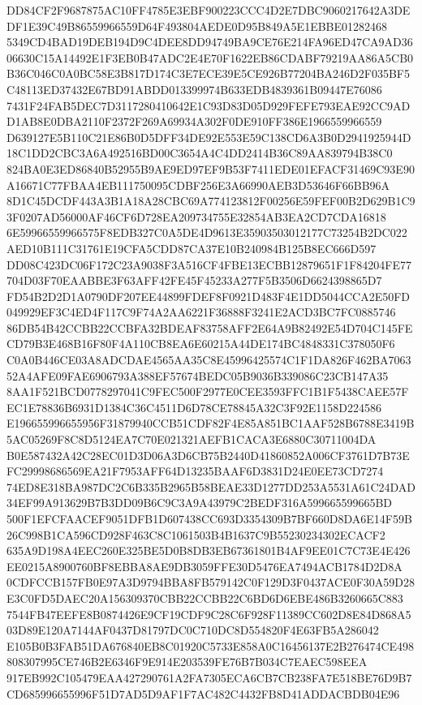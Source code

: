 \documentclass[UTF8,fontset=fandol,zihao=-4,a4paper]{ctexart}
\begin{document}
{{DD84CF2F9687875AC10FF4785E3EBF900223CCC4D2E7DBC9060217642A3DEDF1E39C49B86559966559D64F493804AEDE0D95B849A5E1EBBE01282468
5349CD4BAD19DEB194D9C4DEE8DD94749BA9CE76E214FA96ED47CA9AD3606630C15A14492E1F3EB0B47ADC2E4E70F1622EB86CDABF79219AA86A5CB0
B36C046C0A0BC58E3B817D174C3E7ECE39E5CE926B77204BA246D2F035BF5C48113ED37432E67BD91ABDD013399974B633EDB4839361B09447E76086
7431F24FAB5DEC7D3117280410642E1C93D83D05D929FEFE793EAE92CC9ADD1AB8E0DBA2110F2372F269A69934A302F0DE910FF386E1966559966559
D639127E5B110C21E86B0D5DFF34DE92E553E59C138CD6A3B0D2941925944D18C1DD2CBC3A6A492516BD00C3654A4C4DD2414B36C89AA839794B38C0
824BA0E3ED86840B52955B9AE9ED97EF9B53F7411EDE01EFACF31469C93E90A16671C77FBAA4EB111750095CDBF256E3A66990AEB3D53646F66BB96A
8D1C45DCDF443A3B1A18A28CBC69A774123812F00256E59FEF00B2D629B1C93F0207AD56000AF46CF6D728EA209734755E32854AB3EA2CD7CDA16818
6E59966559966575F8EDB327C0A5DE4D9613E35903503012177C73254B2DC022AED10B111C31761E19CFA5CDD87CA37E10B240984B125B8EC666D597
DD08C423DC06F172C23A9038F3A516CF4FBE13ECBB12879651F1F84204FE77704D03F70EAABBE3F63AFF42FE45F45233A277F5B3506D6624398865D7
FD54B2D2D1A0790DF207EE44899FDEF8F0921D483F4E1DD5044CCA2E50FD049929EF3C4ED4F117C9F74A2AA6221F36888F3241E2ACD3BC7FC0885746
86DB54B42CCBB22CCBFA32BDEAF83758AFF2E64A9B82492E54D704C145FECD79B3E468B16F80F4A110CB8EA6E60215A44DE174BC4848331C378050F6
C0A0B446CE03A8ADCDAE4565AA35C8E45996425574C1F1DA826F462BA706352A4AFE09FAE6906793A388EF57674BEDC05B9036B339086C23CB147A35
8AA1F521BCD0778297041C9FEC500F2977E0CEE3593FFC1B1F5438CAEE57FEC1E78836B6931D1384C36C4511D6D78CE78845A32C3F92E1158D224586
E196655996655956F31879940CCB51CDF82F4E85A851BC1AAF528B6788E3419B5AC05269F8C8D5124EA7C70E021321AEFB1CACA3E6880C30711004DA
B0E587432A42C28EC01D3D06A3D6CB75B2440D41860852A006CF3761D7B73EFC29998686569EA21F7953AFF64D13235BAAF6D3831D24E0EE73CD7274
74ED8E318BA987DC2C6B335B2965B58BEAE33D1277DD253A5531A61C24DAD34EF99A913629B7B3DD09B6C9C3A9A43979C2BEDF316A599665599665BD
500F1EFCFAACEF9051DFB1D607438CC693D3354309B7BF660D8DA6E14F59B26C998B1CA596CD928F463C8C1061503B4B1637C9B55230234302ECACF2
635A9D198A4EEC260E325BE5D0B8DB3EB67361801B4AF9EE01C7C73E4E426EE0215A8900760BF8EBBA8AE9DB3059FFE30D5476EA7494ACB1784D2D8A
0CDFCCB157FB0E97A3D9794BBA8FB579142C0F129D3F0437ACE0F30A59D28E3C0FD5DAEC20A156309370CBB22CCBB22C6BD6D6EBE486B3260665C883
7544FB47EEFE8B0874426E9CF19CDF9C28C6F928F11389CC602D8E84D868A503D89E120A7144AF0437D81797DC0C710DC8D554820F4E63FB5A286042
E105B0B3FAB51DA676840EB8C01920C5733E858A0C16456137E2B276474CE498808307995CE746B2E6346F9E914E203539FE76B7B034C7EAEC598EEA
917EB992C105479EAA427290761A2FA7305ECA6CB7CB238FA7E518BE76D9B7CD685996655996F51D7AD5D9AF1F7AC482C4432FB8D41ADDACBDB04E96
}}
\end{document}
